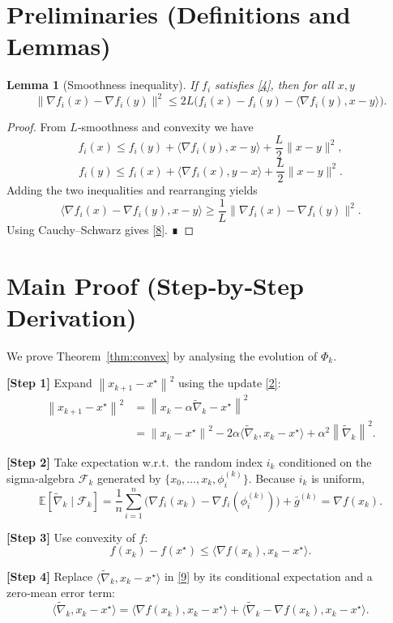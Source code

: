 \documentclass{article}
\newtheorem{lemma}{Lemma}
\newcommand{\E}{\mathbb{E}}
\newcommand{\norm}[1]{\left\lVert #1\right\rVert}
\begin{document}
\section*{Preliminaries (Definitions and Lemmas)}
\begin{lemma}[Smoothness inequality]\label{lem:smooth}
If $f_i$ satisfies \eqref{4}, then for all $x,y$
\[
\|\nabla f_i(x)-\nabla f_i(y)\|^{2}\le 2L\bigl(f_i(x)-f_i(y)-\langle\nabla f_i(y),x-y\rangle\bigr).
\tag{8}
\]
\end{lemma}
\begin{proof}
From $L$‑smoothness and convexity we have
\[
f_i(x)\le f_i(y)+\langle\nabla f_i(y),x-y\rangle+\frac{L}{2}\|x-y\|^{2},
\]
\[
f_i(y)\le f_i(x)+\langle\nabla f_i(x),y-x\rangle+\frac{L}{2}\|x-y\|^{2}.
\]
Adding the two inequalities and rearranging yields
\[
\langle\nabla f_i(x)-\nabla f_i(y),x-y\rangle\ge\frac{1}{L}\|\nabla f_i(x)-\nabla f_i(y)\|^{2}.
\]
Using Cauchy–Schwarz gives \eqref{8}. ∎
\end{proof}

\section*{Main Proof (Step‑by‑Step Derivation)}
We prove Theorem~\ref{thm:convex} by analysing the evolution of $\Phi_k$.

\bigskip
\noindent\textbf{[Step 1]} Expand $\norm{x_{k+1}-x^\star}^{2}$ using the update \eqref{2}:
\[
\begin{aligned}
\norm{x_{k+1}-x^\star}^{2}
&=\norm{x_{k}-\alpha\widetilde\nabla_k-x^\star}^{2}\\
&=\norm{x_k-x^\star}^{2}
-2\alpha\langle \widetilde\nabla_k, x_k-x^\star\rangle
+\alpha^{2}\norm{\widetilde\nabla_k}^{2}.
\end{aligned}
\tag{9}
\]

\noindent\textbf{[Step 2]} Take expectation w.r.t.\ the random index $i_k$ conditioned on the sigma‑algebra $\mathcal{F}_k$ generated by $\{x_0,\dots,x_k,\phi_i^{(k)}\}$.  
Because $i_k$ is uniform,
\[
\E[\widetilde\nabla_k\mid\mathcal{F}_k]
= \frac1n\sum_{i=1}^{n}\bigl(\nabla f_i(x_k)-\nabla f_i(\phi_i^{(k)})\bigr)+\bar g^{(k)}
= \nabla f(x_k).
\tag{10}
\]

\noindent\textbf{[Step 3]} Use convexity of $f$:
\[
f(x_k)-f(x^\star)\le\langle\nabla f(x_k),x_k-x^\star\rangle.
\tag{11}
\]

\noindent\textbf{[Step 4]} Replace $\langle \widetilde\nabla_k, x_k-x^\star\rangle$ in \eqref{9} by its conditional expectation and a zero‑mean error term:
\[
\langle \widetilde\nabla_k, x_k-x^\star\rangle
= \langle \nabla f(x_k),x_k-x^\star\rangle
+ \langle \widetilde\nabla_k-\nabla f(x_k),x_k-x^\star\rangle .
\tag{12}
\]
\end{document}
